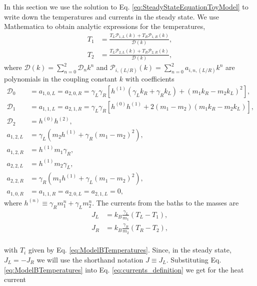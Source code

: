%
In this section we use the solution to Eq. \eqref{eq:SteadyStateEquationToyModel} to write down the temperatures and currents in the steady state. We use Mathematica to obtain analytic expressions for the temperatures,
%
\begin{align}
  T_1 &= \frac{T_L \mathcal{P}_{1,L}(k) + T_R \mathcal{P}_{1,R}(k)}{\mathcal{D}(k)},\nonumber
  \\
  T_2 &= \frac{T_L \mathcal{P}_{2,L}(k) + T_R \mathcal{P}_{2,R}(k)}{\mathcal{D}(k)},
  \label{eq:ModelBTemperatures}
\end{align}
%
where $\mathcal{D}(k) =  \sum\limits_{n=0}^2 \mathcal{D}_n k^n$ and $\mathcal{P}_{i,(L/R)}(k) = \sum\limits_{n=0}^2 a_{i,n,(L/R)} k^n$ are polynomials in the coupling constant $k$ with coefficients
%
\begin{align}
  \mathcal{D}_0 &= a_{1,0,L} = a_{2,0,R} = \gamma _L \gamma _R \left[h^{(1)} \left(\gamma_L k_R +\gamma_R k_L \right)+\left(m_1 k_R-m_2 k_L\right)^2\right],\nonumber
  \\
  \mathcal{D}_1 &= a_{1,1,L} = a_{2,1,R} = \gamma _L \gamma _R \left[h^{(0)} h^{(1)}+2 \left(m_1-m_2\right) \left(m_1 k_R-m_2 k_L\right)\right],\nonumber
  \\
  \mathcal{D}_2 &= h^{(0)} h^{(2)},\nonumber
  \\
  a_{1,2,L} &= \gamma _L \left(m_2 h^{(1)} + \gamma_R (m_1 - m_2)^2 \right),\nonumber
  \\
  a_{1,2,R} &= h^{(1)} m_1 \gamma_R,\nonumber
  \\
  a_{2,2,L} &= h^{(1)} m_2 \gamma_L,\nonumber
  \\
  a_{2,2,R} &= \gamma _R \left( m_1 h^{(1)} + \gamma_L (m_1-m_2)^2 \right),\nonumber
  \\
  a_{1,0,R} &= a_{1,1,R} = a_{2,0,L} = a_{2,1,L} = 0,
  \label{eq:SolutionPolynomialCoefficients}
\end{align}
%
where $h^{(n)}\equiv \gamma_R m_1^n + \gamma_L m_2^n$. The currents from the baths to the masses \cite{Simon2019} are
%
\begin{equation}
  \begin{split}
    J_L &= k_B \frac{\gamma_L}{m_1} \left( T_L - T_1 \right),\\
    J_R &= k_B \frac{\gamma_R}{m_2} \left( T_R - T_2 \right),
    \label{eq:currents_definition}
  \end{split}
\end{equation}
\\
%
with $T_i$ given by Eq. \eqref{eq:ModelBTemperatures}. Since, in the steady state, $J_L = -J_R$ we will use the shorthand notation $J \equiv J_L$. Substituting Eq. \eqref{eq:ModelBTemperatures} into Eq.  \eqref{eq:currents_definition} we get for the heat current
